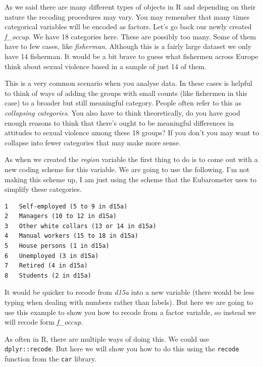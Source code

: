 \documentclass[
]{book}
\begin{document}
As we said there are many different types of objects in R and depending on their nature the recoding procedures may vary. You may remember that many times categorical variables will be encoded as factors. Let's go back our newly created \emph{f\_occup}. We have 18 categories here. These are possibly too many. Some of them have to few cases, like \emph{fisherman}. Although this is a fairly large dataset we only have 14 fisherman. It would be a bit brave to guess what fishermen across Europe think about sexual violence based in a sample of just 14 of them.

This is a very common scenario when you analyse data. In these cases is helpful to think of ways of adding the groups with small counts (like fishermen in this case) to a broader but still meaningful category. People often refer to this as \emph{collapsing categories}. You also have to think theoretically, do you have good enough reasons to think that there's ought to be meaningful differences in attitudes to sexual violence among these 18 groups? If you don't you may want to collapse into fewer categories that may make more sense.

As when we created the \emph{region} variable the first thing to do is to come out with a new coding scheme for this variable. We are going to use the following. I'm not making this scheme up, I am just using the scheme that the Eubarometer uses to simplify these categories.

\begin{verbatim}
1   Self-employed (5 to 9 in d15a)  
2   Managers (10 to 12 in d15a) 
3   Other white collars (13 or 14 in d15a)  
4   Manual workers (15 to 18 in d15a)   
5   House persons (1 in d15a)   
6   Unemployed (3 in d15a)  
7   Retired (4 in d15a) 
8   Students (2 in d15a)
\end{verbatim}

It would be quicker to recode from \emph{d15a} into a new variable (there would be less typing when dealing with numbers rather than labels). But here we are going to use this example to show you how to recode from a factor variable, so instead we will recode form \emph{f\_occup}.

As often in R, there are multiple ways of doing this. We could use \texttt{dplyr::recode}. But here we will show you how to do this using the \texttt{recode} function from the \texttt{car} library.
\end{document}
